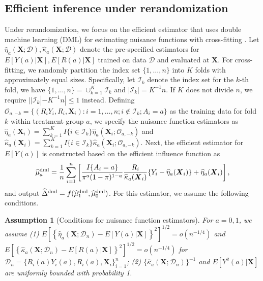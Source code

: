\documentclass[12pt]{article}
\newtheorem{assumption}{Assumption}
\newcommand{\bX}{\boldsymbol{X}}\newcommand{\bO}{\boldsymbol{O}}
\begin{document}
{\subsection{Efficient inference under rerandomization}\label{subsec: eff-rerandom}
Under rerandomization, we focus on the efficient estimator that uses double machine learning (DML) for estimating nuisance functions with cross-fitting \citep{chernozhukov2018double}. Let $\widehat{\eta}_a(\bX;\mathcal{D}), \widehat{\kappa}_a(\bX;\mathcal{D})$ denote the pre-specified estimators for $E[Y(a)|\bX], E[R(a)|\bX]$ trained on data $\mathcal{D}$ and evaluated at $\bX$. For cross-fitting, we randomly partition the index set $\{1,\dots,n\}$ into $K$ folds with approximately equal sizes. Specifically, let $\mathcal{I}_k$ denote the index set for the $k$-th fold, we have $\{1,\dots,n\}=\cup_{k=1}^K \mathcal{I}_k$ and $|\mathcal{I}_k| = K^{-1}n$. If $K$ does not divide $n$, we require $||\mathcal{I}_k|- K^{-1}n| \le 1$ instead. Defining $\mathcal{O}_{a,-k} = \{(R_iY_i,R_i,\bX_i): i = 1,\dots, n;i \notin \mathcal{I}_k; A_i =a\}$ as the training data for fold $k$ within treatment group $a$, we specify the nuisance function estimators as $\widehat{\eta}_a(\bX_i) = \sum_{k=1}^K I\{i \in \mathcal{I}_k\}\widehat{\eta}_a(\bX_i;\mathcal{O}_{a,-k})$ and $\widehat{\kappa}_a(\bX_i) = \sum_{k=1}^K I\{i \in \mathcal{I}_k\}\widehat{\kappa}_a(\bX_i;\mathcal{O}_{a,-k})$. Next, the efficient estimator for $E[Y(a)]$ is constructed based on the efficient influence function as
\begin{equation}\label{eq: eff}
    \widehat{\mu}_a^{\textup{dml}} = \frac{1}{n}\sum_{i=1}^n \left[\frac{I\{A_i=a\}}{\pi^a(1-\pi)^{1-a}}\frac{R_i}{\widehat{\kappa}_a(\bX_i)}\{Y_i - \widehat{\eta}_a(\bX_i)\} + \widehat{\eta}_a(\bX_i)\right],
\end{equation}
and output $\widehat{\Delta}^{\textup{dml}} = f(\widehat{\mu}_1^{\textup{dml}}, \widehat{\mu}_0^{\textup{dml}})$.  For this estimator, we assume the following conditions. 

\begin{assumption}[Conditions for nuisance function estimators]\label{assp: machine-learning}
  For $a = 0,1$, we assume (1) $E[\left\{\widehat{\eta}_a(\bX;\mathcal{D}_n)-E[Y(a)|\bX]\right\}^2]^{1/2} = o(n^{-1/4})$ and $E[\left\{\widehat{\kappa}_a(\bX;\mathcal{D}_n)-E[R(a)|\bX]\right\}^2]^{1/2} = o(n^{-1/4})$ for $\mathcal{D}_n = \{R_i(a)Y_i(a), R_i(a),\bX_i\}_{i=1}^n$; (2) $ \{\widehat{\kappa}_a(\bX;\mathcal{D}_n)\}^{-1}$ and $ E[Y^2(a)|\bX]$ are uniformly bounded with probability 1.
\end{assumption}

}
\end{document}
